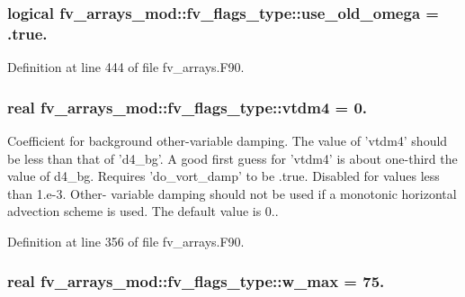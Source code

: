 \subsubsection[{use\-\_\-old\-\_\-omega}]{\setlength{\rightskip}{0pt plus 5cm}logical fv\-\_\-arrays\-\_\-mod\-::fv\-\_\-flags\-\_\-type\-::use\-\_\-old\-\_\-omega = .true.}\label{structfv__arrays__mod_1_1fv__flags__type_a464a6eb5ffb4492e2ea207efc9c041ed}


Definition at line 444 of file fv\-\_\-arrays.\-F90.

\subsubsection[{vtdm4}]{\setlength{\rightskip}{0pt plus 5cm}real fv\-\_\-arrays\-\_\-mod\-::fv\-\_\-flags\-\_\-type\-::vtdm4 = 0.}\label{structfv__arrays__mod_1_1fv__flags__type_ae230295af17d57507255dfe20ad98f6a}


Coefficient for background other-\/variable damping. The value of 'vtdm4' should be less than that of 'd4\-\_\-bg'. A good first guess for 'vtdm4' is about one-\/third the value of d4\-\_\-bg. Requires 'do\-\_\-vort\-\_\-damp' to be .true. Disabled for values less than 1.\-e-\/3. Other-\/ variable damping should not be used if a monotonic horizontal advection scheme is used. The default value is 0.. 



Definition at line 356 of file fv\-\_\-arrays.\-F90.

\subsubsection[{w\-\_\-max}]{\setlength{\rightskip}{0pt plus 5cm}real fv\-\_\-arrays\-\_\-mod\-::fv\-\_\-flags\-\_\-type\-::w\-\_\-max = 75.}\label{structfv__arrays__mod_1_1fv__flags__type_a7966e3f1383bae981b26a75ce43ec46b}


